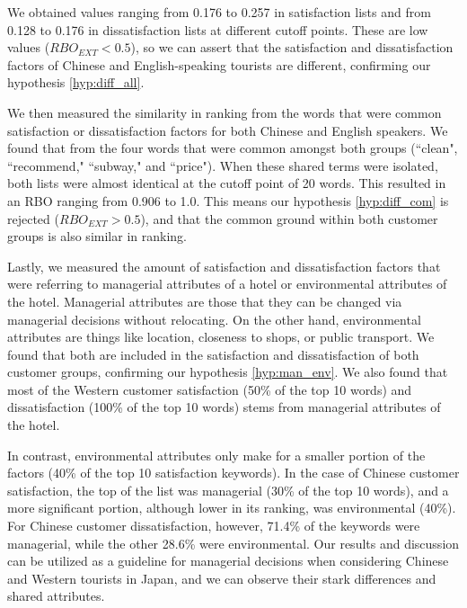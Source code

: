 \documentclass[smallextended,natbib]{svjour3}       %
\begin{document}
We obtained values ranging from 0.176 to 0.257 in satisfaction lists and from 0.128 to 0.176 in dissatisfaction lists at different cutoff points. These are low values (\(RBO_{EXT} < 0.5\)), so we can assert that the satisfaction and dissatisfaction factors of Chinese and English-speaking tourists are different, confirming our hypothesis \ref{hyp:diff_all}. 

We then measured the similarity in ranking from the words that were common satisfaction or dissatisfaction factors for both Chinese and English speakers. We found that from the four words that were common amongst both groups (``clean", ``recommend," ``subway," and ``price"). When these shared terms were isolated, both lists were almost identical at the cutoff point of 20 words. This resulted in an RBO ranging from 0.906 to 1.0. This means our hypothesis \ref{hyp:diff_com} is rejected (\(RBO_{EXT} > 0.5\)), and that the common ground within both customer groups is also similar in ranking.

Lastly, we measured the amount of satisfaction and dissatisfaction factors that were referring to managerial attributes of a hotel or environmental attributes of the hotel. Managerial attributes are those that they can be changed via managerial decisions without relocating. On the other hand, environmental attributes are things like location, closeness to shops, or public transport. We found that both are included in the satisfaction and dissatisfaction of both customer groups, confirming our hypothesis \ref{hyp:man_env}. We also found that most of the Western customer satisfaction (50\% of the top 10 words) and dissatisfaction (100\% of the top 10 words) stems from managerial attributes of the hotel.

In contrast, environmental attributes only make for a smaller portion of the factors (40\% of the top 10 satisfaction keywords). In the case of Chinese customer satisfaction, the top of the list was managerial (30\% of the top 10 words), and a more significant portion, although lower in its ranking, was environmental (40\%). For Chinese customer dissatisfaction, however, 71.4\% of the keywords were managerial, while the other 28.6\% were environmental. Our results and discussion can be utilized as a guideline for managerial decisions when considering Chinese and Western tourists in Japan, and we can observe their stark differences and shared attributes. 
\end{document}
